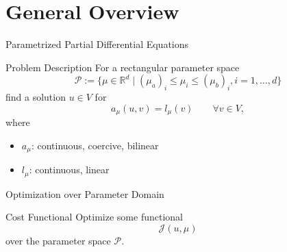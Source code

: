 \section{General Overview}

\begin{frame}{Parametrized Partial Differential Equations}

    \begin{block}{Problem Description}
        For a rectangular parameter space
        \begin{equation*}
            \mathcal{P} := \{ \mu \in \mathbb{R}^d \; | \; {(\mu_a)}_i \leq \mu_i \leq {(\mu_b)}_i, i = 1, \dots, d \}
        \end{equation*}
        find a solution $u \in V$ for
        \begin{equation*}
            a_\mu(u, v) = l_\mu(v) \qquad \forall v \in V,
        \end{equation*}
        where
        \begin{itemize}
            \item $a_\mu$: continuous, coercive, bilinear
            \item $l_\mu$: continuous, linear
        \end{itemize}
    \end{block}
\end{frame}

\begin{frame}{Optimization over Parameter Domain}
    \begin{block}{Cost Functional}
        Optimize some functional
        \begin{equation*}
            \mathcal{J}(u, \mu)
        \end{equation*}
        over the parameter space $\mathcal{P}$.
    \end{block}

\end{frame}

